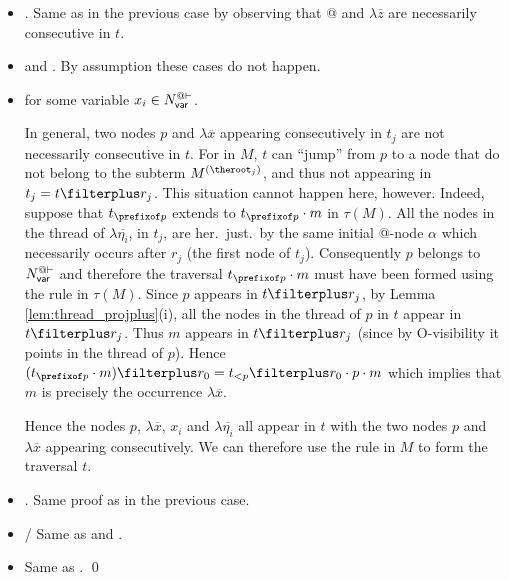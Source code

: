 \begin{itemize}
    \item {}
          . Same as in the previous case by observing that @ and $\lambda \overline{z}$
are necessarily consecutive in $t$.

    \item {} and . By assumption these cases do not happen.

    \item {}
     for some
        variable $x_i \in N_{\sf var}^{@\vdash}$.

In general, two nodes $p$ and $\lambda \overline{x}$ appearing consecutively in $t_j$ are not necessarily consecutive in $t$. For in $M$, $t$ can ``jump'' from $p$ to a node that do not belong to the subterm $M^{(\theroot_j)}$, and thus not appearing in $t_j = t\filterplus r_j$.
This situation cannot happen here, however. Indeed, suppose that $t_{\prefixof p}$ extends to $t_{\prefixof p} \cdot m$ in $\tau(M)$.
 All the nodes in the thread of $\lambda \overline{\eta_i}$, in
$t_j$, are her.\ just.\ by the same initial @-node $\alpha$
which necessarily occurs after $r_j$ (the first node of $t_j$).
Consequently $p$ belongs to $N_{\sf var}^{@\vdash}$ and
therefore the traversal $t_{\prefixof p}\cdot m$ must have been
formed using the rule  in $\tau(M)$. Since $p$
appears in $t\filterplus r_j$, by Lemma
\ref{lem:thread_projplus}(i), all the nodes in the thread of $p$
in $t$ appear in $t\filterplus r_j$. Thus $m$ appears in
$t\filterplus r_j$ (since by O-visibility it points in the
thread of $p$). Hence $(t_{\prefixof p} \cdot m)\filterplus r_0
=  t_{<p}\filterplus r_0 \cdot p \cdot m$ which implies that $m$
is precisely the occurrence $\lambda \overline{x}$.

Hence the nodes $p$, $\lambda \overline{x}$, $x_i$ and $\lambda \overline{\eta_i}$ all appear in $t$
with the two nodes $p$ and $\lambda \overline{x}$ appearing consecutively. We can therefore use the rule  in $M$ to form the traversal $t$.

    \item {}. Same proof as in the previous case.
    \item {}/ Same as  and .
    \item {} Same as  .
\qed
  \end{itemize}



